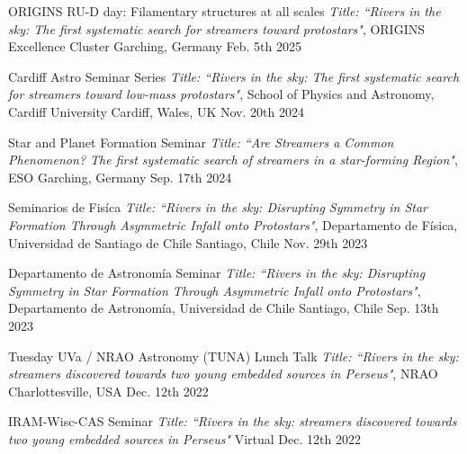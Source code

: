 


\begin{cvhonors}
    \cvhonor
	{ORIGINS RU-D day: Filamentary structures at all scales} %
	{\textit{Title: ``Rivers in the sky:  The first systematic search for streamers toward protostars"}, ORIGINS Excellence Cluster} %
	{Garching, Germany} %
	{Feb. 5th 2025} %
    
    \cvhonor
	{Cardiff Astro Seminar Series} %
	{\textit{Title: ``Rivers in the sky:  The first systematic search for streamers toward low-mass protostars"}, School of Physics and Astronomy, Cardiff University} %
	{Cardiff, Wales, UK} %
	{Nov. 20th 2024} %
    
    	 \cvhonor
	{Star and Planet Formation Seminar} %
	{\textit{Title: ``Are Streamers a Common Phenomenon? The first systematic search of streamers in a star-forming Region"}, ESO} %
	{Garching, Germany} %
	{Sep. 17th 2024} %
	
    \cvhonor
	{Seminarios de Fis\'ica} %
	{\textit{Title: ``Rivers in the sky:  Disrupting Symmetry in Star Formation Through Asymmetric Infall onto Protostars"}, Departamento de F\'isica, Universidad de Santiago de Chile} %
	{Santiago, Chile} %
	{Nov. 29th 2023} %
	
		 \cvhonor
	{Departamento de Astronom\'ia Seminar} %
	{\textit{Title: ``Rivers in the sky:  Disrupting Symmetry in Star Formation Through Asymmetric Infall onto Protostars"}, Departamento de Astronom\'ia, Universidad de Chile} %
	{Santiago, Chile} %
	{Sep. 13th 2023} %
	
	 \cvhonor
	{Tuesday UVa / NRAO Astronomy (TUNA) Lunch Talk} %
	{\textit{Title: ``Rivers in the sky: streamers discovered towards two young embedded sources in Perseus"}, NRAO} %
	{Charlottesville, USA} %
	{Dec. 12th 2022} %
	
	 \cvhonor
	{IRAM-Wisc-CAS Seminar} %
	{\textit{Title: ``Rivers in the sky: streamers discovered towards two young embedded sources in Perseus"}} %
	{Virtual} %
	{Dec. 12th 2022} %
	

	
\end{cvhonors}

